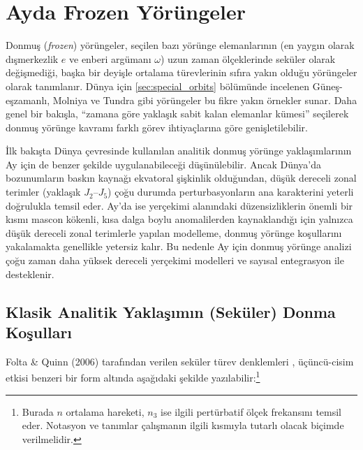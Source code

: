 \section{Ayda Frozen Yörüngeler}
\label{sec:frozen_orbits}


Donmuş (\emph{frozen}) yörüngeler, seçilen bazı yörünge elemanlarının (en yaygın olarak dışmerkezlik $e$ ve enberi argümanı $\omega$) uzun zaman ölçeklerinde seküler olarak değişmediği, başka bir deyişle ortalama türevlerinin sıfıra yakın olduğu yörüngeler olarak tanımlanır. Dünya için \ref{sec:special_orbits} bölümünde incelenen Güneş-eşzamanlı, Molniya ve Tundra gibi yörüngeler bu fikre yakın örnekler sunar. Daha genel bir bakışla, ``zamana göre yaklaşık sabit kalan elemanlar kümesi'' seçilerek donmuş yörünge kavramı farklı görev ihtiyaçlarına göre genişletilebilir.

İlk bakışta Dünya çevresinde kullanılan analitik donmuş yörünge yaklaşımlarının Ay için de benzer şekilde uygulanabileceği düşünülebilir. Ancak Dünya'da bozunumların baskın kaynağı ekvatoral şişkinlik olduğundan, düşük dereceli zonal terimler (yaklaşık $J_2$--$J_5$) çoğu durumda perturbasyonların ana karakterini yeterli doğrulukla temsil eder. Ay'da ise yerçekimi alanındaki düzensizliklerin önemli bir kısmı mascon kökenli, kısa dalga boylu anomalilerden kaynaklandığı için yalnızca düşük dereceli zonal terimlerle yapılan modelleme, donmuş yörünge koşullarını yakalamakta genellikle yetersiz kalır. Bu nedenle Ay için donmuş yörünge analizi çoğu zaman daha yüksek dereceli yerçekimi modelleri ve sayısal entegrasyon ile desteklenir.

\subsection{Klasik Analitik Yaklaşımın (Seküler) Donma Koşulları}

Folta \& Quinn (2006) tarafından verilen seküler türev denklemleri \cite{Folta2006}, üçüncü-cisim etkisi benzeri bir form altında aşağıdaki şekilde yazılabilir:\footnote{Burada $n$ ortalama hareketi, $n_3$ ise ilgili pertürbatif ölçek frekansını temsil eder. Notasyon ve tanımlar çalışmanın ilgili kısmıyla tutarlı olacak biçimde verilmelidir.}

